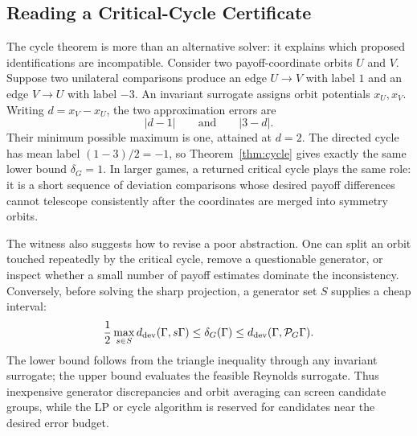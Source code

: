 \subsection{Reading a Critical-Cycle Certificate}

The cycle theorem is more than an alternative solver: it explains which proposed identifications are incompatible.  Consider two payoff-coordinate orbits $U$ and $V$.  Suppose two unilateral comparisons produce an edge $U\to V$ with label $1$ and an edge $V\to U$ with label $-3$.  An invariant surrogate assigns orbit potentials $x_U,x_V$.  Writing $d=x_V-x_U$, the two approximation errors are
\[
|d-1|
\qquad\text{and}\qquad
|3-d|.
\]
Their minimum possible maximum is one, attained at $d=2$.  The directed cycle has mean label $(1-3)/2=-1$, so Theorem~\ref{thm:cycle} gives exactly the same lower bound $\delta_G=1$.  In larger games, a returned critical cycle plays the same role: it is a short sequence of deviation comparisons whose desired payoff differences cannot telescope consistently after the coordinates are merged into symmetry orbits.

The witness also suggests how to revise a poor abstraction.  One can split an orbit touched repeatedly by the critical cycle, remove a questionable generator, or inspect whether a small number of payoff estimates dominate the inconsistency.  Conversely, before solving the sharp projection, a generator set $S$ supplies a cheap interval:
\begin{equation}
\frac12\max_{s\in S}d_{\mathrm{dev}}(\Gamma,s\Gamma)
\le
\delta_G(\Gamma)
\le
d_{\mathrm{dev}}(\Gamma,\mathcal P_G\Gamma).
\label{eq:screening-bounds}
\end{equation}
The lower bound follows from the triangle inequality through any invariant surrogate; the upper bound evaluates the feasible Reynolds surrogate.  Thus inexpensive generator discrepancies and orbit averaging can screen candidate groups, while the LP or cycle algorithm is reserved for candidates near the desired error budget.
